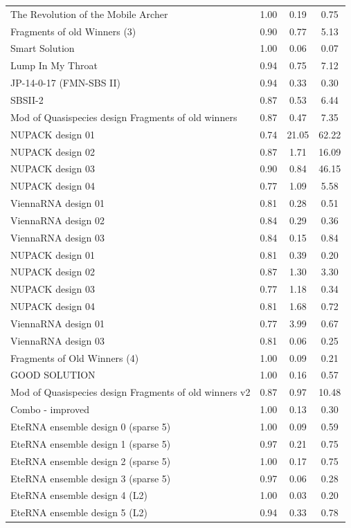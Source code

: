 \documentclass[letter]{bioinfo}
\begin{document}
\begin{center}
\begin{longtable}{l ccc}
The Revolution of the Mobile Archer	&1.00 	&0.19 	&0.75 \\
Fragments of old Winners (3)	&0.90 	&0.77 	&5.13 \\
Smart Solution				&1.00 	&0.06 	&0.07 \\
Lump In My Throat				&0.94 	&0.75 	&7.12 \\
JP-14-0-17 (FMN-SBS II)		&0.94 	&0.33 	&0.30 \\
SBSII-2						&0.87 	&0.53 	&6.44 \\
Mod of Quasispecies design Fragments of old winners	&0.87 	&0.47 	&7.35 \\
NUPACK design 01				&0.74 	&21.05 	&62.22 \\
NUPACK design 02				&0.87 	&1.71 	&16.09 \\
NUPACK design 03				&0.90 	&0.84 	&46.15 \\
NUPACK design 04				&0.77 	&1.09 	&5.58 \\
ViennaRNA design 01			&0.81 	&0.28 	&0.51 \\
ViennaRNA design 02			&0.84 	&0.29 	&0.36 \\
ViennaRNA design 03			&0.84 	&0.15 	&0.84 \\
NUPACK design 01				&0.81 	&0.39 	&0.20 \\
NUPACK design 02				&0.87 	&1.30 	&3.30 \\
NUPACK design 03				&0.77 	&1.18 	&0.34 \\
NUPACK design 04				&0.81 	&1.68 	&0.72 \\
ViennaRNA design 01			&0.77 	&3.99 	&0.67 \\
ViennaRNA design 03			&0.81 	&0.06 	&0.25 \\
Fragments of Old Winners (4)	&1.00 	&0.09 	&0.21 \\
GOOD SOLUTION					&1.00 	&0.16 	&0.57 \\
Mod of Quasispecies design Fragments of old winners v2		&0.87 	&0.97 	&10.48 \\
Combo - improved				&1.00 	&0.13 	&0.30 \\
EteRNA ensemble design 0 (sparse 5) 		&1.00 	&0.09 	&0.59 \\
EteRNA ensemble design 1 (sparse 5)		&0.97 	&0.21 	&0.75 \\
EteRNA ensemble design 2 (sparse 5)		&1.00 	&0.17 	&0.75 \\
EteRNA ensemble design 3 (sparse 5)		&0.97 	&0.06 	&0.28 \\
EteRNA ensemble design 4 (L2)		&1.00 	&0.03 	&0.20 \\
EteRNA ensemble design 5 (L2)		&0.94 	&0.33 	&0.78 \\

\end{longtable}
\end{center}
\end{document}
